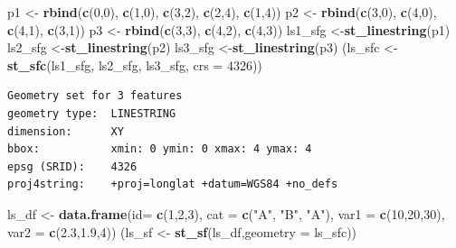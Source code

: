 \documentclass[]{book}
\newenvironment{Shaded}{\begin{snugshade}}{\end{snugshade}}
\newcommand{\KeywordTok}[1]{\textcolor[rgb]{0.13,0.29,0.53}{\textbf{#1}}}
\newcommand{\DataTypeTok}[1]{\textcolor[rgb]{0.13,0.29,0.53}{#1}}
\newcommand{\DecValTok}[1]{\textcolor[rgb]{0.00,0.00,0.81}{#1}}
\newcommand{\FloatTok}[1]{\textcolor[rgb]{0.00,0.00,0.81}{#1}}
\newcommand{\StringTok}[1]{\textcolor[rgb]{0.31,0.60,0.02}{#1}}
\newcommand{\NormalTok}[1]{#1}
\begin{document}
\begin{Shaded}
\begin{Highlighting}[]
\NormalTok{p1 <-}\StringTok{ }\KeywordTok{rbind}\NormalTok{(}\KeywordTok{c}\NormalTok{(}\DecValTok{0}\NormalTok{,}\DecValTok{0}\NormalTok{), }\KeywordTok{c}\NormalTok{(}\DecValTok{1}\NormalTok{,}\DecValTok{0}\NormalTok{), }\KeywordTok{c}\NormalTok{(}\DecValTok{3}\NormalTok{,}\DecValTok{2}\NormalTok{), }\KeywordTok{c}\NormalTok{(}\DecValTok{2}\NormalTok{,}\DecValTok{4}\NormalTok{), }\KeywordTok{c}\NormalTok{(}\DecValTok{1}\NormalTok{,}\DecValTok{4}\NormalTok{))}
\NormalTok{p2 <-}\StringTok{ }\KeywordTok{rbind}\NormalTok{(}\KeywordTok{c}\NormalTok{(}\DecValTok{3}\NormalTok{,}\DecValTok{0}\NormalTok{), }\KeywordTok{c}\NormalTok{(}\DecValTok{4}\NormalTok{,}\DecValTok{0}\NormalTok{), }\KeywordTok{c}\NormalTok{(}\DecValTok{4}\NormalTok{,}\DecValTok{1}\NormalTok{), }\KeywordTok{c}\NormalTok{(}\DecValTok{3}\NormalTok{,}\DecValTok{1}\NormalTok{))}
\NormalTok{p3 <-}\StringTok{ }\KeywordTok{rbind}\NormalTok{(}\KeywordTok{c}\NormalTok{(}\DecValTok{3}\NormalTok{,}\DecValTok{3}\NormalTok{), }\KeywordTok{c}\NormalTok{(}\DecValTok{4}\NormalTok{,}\DecValTok{2}\NormalTok{), }\KeywordTok{c}\NormalTok{(}\DecValTok{4}\NormalTok{,}\DecValTok{3}\NormalTok{))}
\NormalTok{ls1_sfg <-}\KeywordTok{st_linestring}\NormalTok{(p1)}
\NormalTok{ls2_sfg <-}\KeywordTok{st_linestring}\NormalTok{(p2)}
\NormalTok{ls3_sfg <-}\KeywordTok{st_linestring}\NormalTok{(p3)}
\NormalTok{(ls_sfc <-}\StringTok{ }\KeywordTok{st_sfc}\NormalTok{(ls1_sfg, ls2_sfg, ls3_sfg, }\DataTypeTok{crs =} \DecValTok{4326}\NormalTok{))}
\end{Highlighting}
\end{Shaded}

\begin{verbatim}
Geometry set for 3 features 
geometry type:  LINESTRING
dimension:      XY
bbox:           xmin: 0 ymin: 0 xmax: 4 ymax: 4
epsg (SRID):    4326
proj4string:    +proj=longlat +datum=WGS84 +no_defs
\end{verbatim}

\begin{Shaded}
\begin{Highlighting}[]
\NormalTok{ls_df <-}\StringTok{ }\KeywordTok{data.frame}\NormalTok{(}\DataTypeTok{id=} \KeywordTok{c}\NormalTok{(}\DecValTok{1}\NormalTok{,}\DecValTok{2}\NormalTok{,}\DecValTok{3}\NormalTok{), }\DataTypeTok{cat =} \KeywordTok{c}\NormalTok{(}\StringTok{"A"}\NormalTok{, }\StringTok{"B"}\NormalTok{, }\StringTok{"A"}\NormalTok{), }
                    \DataTypeTok{var1 =} \KeywordTok{c}\NormalTok{(}\DecValTok{10}\NormalTok{,}\DecValTok{20}\NormalTok{,}\DecValTok{30}\NormalTok{), }\DataTypeTok{var2 =} \KeywordTok{c}\NormalTok{(}\FloatTok{2.3}\NormalTok{,}\FloatTok{1.9}\NormalTok{,}\DecValTok{4}\NormalTok{))}
\NormalTok{(ls_sf <-}\StringTok{ }\KeywordTok{st_sf}\NormalTok{(ls_df,}\DataTypeTok{geometry =}\NormalTok{ ls_sfc))}
\end{Highlighting}
\end{Shaded}
\end{document}
